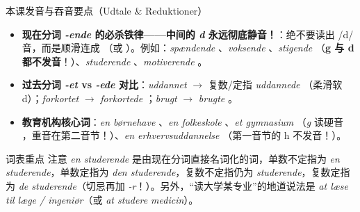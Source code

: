 \begin{tipbox}{本课发音与吞音要点（Udtale \& Reduktioner）}
\begin{itemize}
  \item \textbf{现在分词 \textit{-ende} 的必杀铁律——中间的 \textit{d} 永远彻底静音！}：绝不要读出 /d/ 音，而是顺滑连成 （或 ）。例如：\textit{spændende} 、\textit{voksende} 、\textit{stigende} （\textbf{g 与 d 都不发音}！）、\textit{studerende} 、\textit{motiverende} 。
  \item \textbf{过去分词 \textit{-et} vs \textit{-ede} 对比}：\textit{uddannet}  $\rightarrow$ 复数/定指 \textit{uddannede} （柔滑软 d）；\textit{forkortet}  $\rightarrow$ \textit{forkortede} ；\textit{brugt}  $\rightarrow$ \textit{brugte} 。
  \item \textbf{教育机构核心词}：\textit{en børnehave} 、\textit{en folkeskole} 、\textit{et gymnasium} （\textit{g} 读硬音 ，重音在第二音节！）、\textit{en erhvervsuddannelse} （第一音节的 h 不发音！）。
\end{itemize}
\end{tipbox}


\begin{tipbox}{词表重点}
注意 \textit{en studerende} 是由现在分词直接名词化的词，单数不定指为 \textit{en studerende}，单数定指为 \textit{den studerende}，复数不定指仍为 \textit{studerende}，复数定指为 \textit{de studerende}（切忌再加 \textit{-r}！）。另外，“读大学某专业”的地道说法是 \textit{at læse til læge / ingeniør}（或 \textit{at studere medicin}）。
\end{tipbox}

